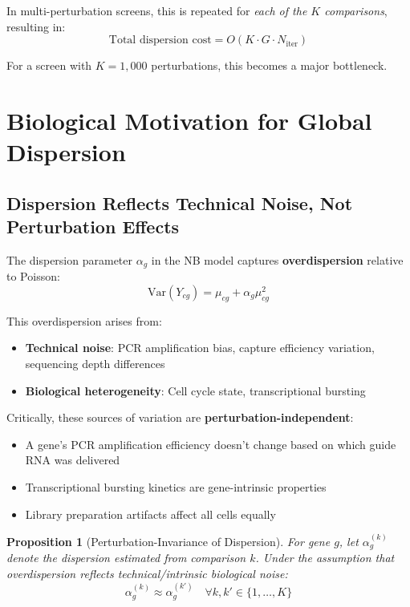 \documentclass[11pt]{article}
\newtheorem{proposition}[theorem]{Proposition}
\theoremstyle{definition}
\theoremstyle{remark}
\begin{document}
In multi-perturbation screens, this is repeated for \emph{each of the $K$ comparisons}, resulting in:
\[
\text{Total dispersion cost} = O(K \cdot G \cdot N_{\text{iter}})
\]

For a screen with $K=1{,}000$ perturbations, this becomes a major bottleneck.

\section{Biological Motivation for Global Dispersion}

\subsection{Dispersion Reflects Technical Noise, Not Perturbation Effects}

The dispersion parameter $\alpha_g$ in the NB model captures \textbf{overdispersion} relative to Poisson:
\[
\text{Var}(Y_{cg}) = \mu_{cg} + \alpha_g \mu_{cg}^2
\]

This overdispersion arises from:
\begin{itemize}
    \item \textbf{Technical noise}: PCR amplification bias, capture efficiency variation, sequencing depth differences
    \item \textbf{Biological heterogeneity}: Cell cycle state, transcriptional bursting
\end{itemize}

Critically, these sources of variation are \textbf{perturbation-independent}:
\begin{itemize}
    \item A gene's PCR amplification efficiency doesn't change based on which guide RNA was delivered
    \item Transcriptional bursting kinetics are gene-intrinsic properties
    \item Library preparation artifacts affect all cells equally
\end{itemize}

\begin{proposition}[Perturbation-Invariance of Dispersion]
For gene $g$, let $\alpha_g^{(k)}$ denote the dispersion estimated from comparison $k$. Under the assumption that overdispersion reflects technical/intrinsic biological noise:
\[
\alpha_g^{(k)} \approx \alpha_g^{(k')} \quad \forall k, k' \in \{1, \ldots, K\}
\]
\end{proposition}
\end{document}

